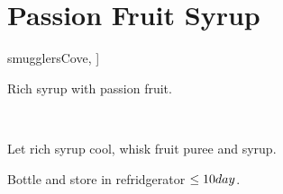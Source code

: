 \section{Passion Fruit Syrup}\label{passionFruitSyrup}

\begin{recipestats}[
        servings=3~$C$,
        preptime=10~\minute,
        original=\citeauthor{smugglersCove}~\cite[p.~325]{smugglersCove},
    ]
\end{recipestats}

\begin{recipeabstract}
    Rich syrup with passion fruit.
\end{recipeabstract}

\begin{ingredientcolumns}[1]
    \begin{ingredientblock}
        \\
    \end{ingredientblock}
\end{ingredientcolumns}

\begin{preparation}
\item Let rich syrup cool, whisk fruit puree and syrup.
\item Bottle and store in refridgerator $\le 10 day$.
\end{preparation}

\recipeend%
